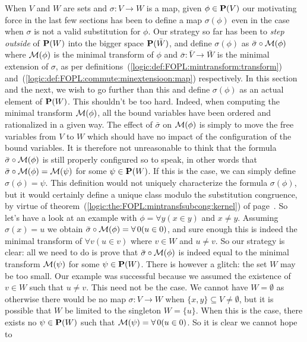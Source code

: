 When $V$ and $W$ are sets and $\sigma:V\to W$ is a map, given
$\phi\in\mbox{${\bf P}(V)$}$ our motivating force in the last few sections has been
to define a map $\sigma(\phi)$ even in the case when $\sigma$ is not
a valid substitution for $\phi$. Our strategy so far has been to
{\em step outside} of ${\bf P}(W)$ into the bigger space ${\bf
P}(\bar{W})$, and define $\sigma(\phi)$ as $\bar{\sigma}\circ{\cal
M}(\phi)$ where ${\cal M}(\phi)$ is the minimal transform of $\phi$
and $\bar{\sigma}:\bar{V}\to\bar{W}$ is the minimal extension of
$\sigma$, as per
definitions~(\ref{logic:def:FOPL:mintransform:transform})
and~(\ref{logic:def:FOPL:commute:minextensioon:map}) respectively.
In this section and the next, we wish to go further than this and
define $\sigma(\phi)$ as an actual element of ${\bf P}(W)$. This
shouldn't be too hard. Indeed, when computing the minimal transform
${\cal M}(\phi)$, all the bound variables have been ordered and
rationalized in a given way. The effect of $\bar{\sigma}$ on ${\cal
M}(\phi)$ is simply to move the free variables from $V$ to $W$ which
should have no impact of the configuration of the bound variables.
It is therefore not unreasonable to think that the formula
$\bar{\sigma}\circ{\cal M}(\phi)$ is still properly configured so to
speak, in other words that $\bar{\sigma}\circ{\cal M}(\phi)={\cal
M}(\psi)$ for some $\psi\in{\bf P}(W)$. If this is the case, we can
simply define $\sigma(\phi)=\psi$. This definition would not
uniquely characterize the formula $\sigma(\phi)$, but it would
certainly define a unique class modulo the substitution congruence,
by virtue of theorem~(\ref{logic:the:FOPL:mintransfsubcong:kernel})
of page~\pageref{logic:the:FOPL:mintransfsubcong:kernel}. So let's
have a look at an example with $\phi=\forall y(x\in y)$ and $x\neq
y$. Assuming $\sigma(x)=u$ we obtain $\bar{\sigma}\circ{\cal
M}(\phi)=\forall\,0(u\in 0)$, and sure enough this is indeed the
minimal transform of $\forall v(u\in v)$ where $v\in W$ and $u\neq
v$. So our strategy is clear: all we need to do is prove that
$\bar{\sigma}\circ{\cal M}(\phi)$ is indeed equal to the minimal
transform ${\cal M}(\psi)$ for some $\psi\in{\bf P}(W)$. There is
however a glitch: the set $W$ may be too small. Our example was
successful because we assumed the existence of $v\in W$ such that
$u\neq v$. This need not be the case. We cannot have $W=\emptyset$
as otherwise there would be no map $\sigma:V\to W$ when
$\{x,y\}\subseteq V\neq\emptyset$, but it is possible that $W$ be
limited to the singleton $W=\{u\}$. When this is the case, there
exists no $\psi\in{\bf P}(W)$ such that ${\cal
M}(\psi)=\forall\,0(u\in 0)$. So it is clear we cannot hope to
